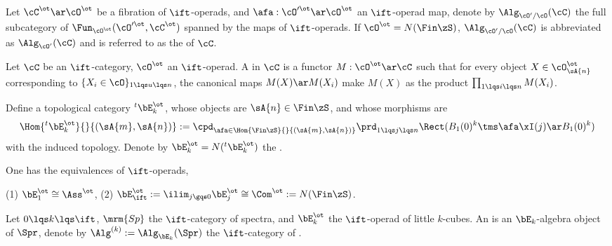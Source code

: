 \documentclass[article, a4paper, twoside]{universal}
\begin{document}
\begin{dfn}[2.1.3.1]
    Let $\cC^{\ot}\ar\cO^{\ot}$ be a fibration of $\ift$-operads, and $\afa:\cO'^{\ot}\ar\cO^{\ot}$ an $\ift$-operad map, denote by $\Alg_{\cO'/\cO}(\cC)$ the full subcategory of $\Fun_{\cO^{\ot}}(\cO'^{\ot},\cC^{\ot})$ spanned by the maps of $\ift$-operads. If $\cO^{\ot}=N(\Fin\zS)$, $\Alg_{\cO'/\cO}(\cC)$ is abbreviated as $\Alg_{\cO'}(\cC)$ and is referred to as the  of $\cC$.
\end{dfn}


\begin{dfn}[2.4.2.1]
    Let $\cC$ be an $\ift$-category, $\cO^{\ot}$ an $\ift$-operad. A  in $\cC$ is a functor $M:\cO^{\ot}\ar\cC$ such that for every object $X\in\cO_{\sA{n}}^{\ot}$ corresponding to $\{X_{i}\in\cO\}_{1\lqs u\lqs n}$, the canonical maps $M(X)\ar M(X_{i})$ make $M(X)$ as the product $\prod_{1\lqs i\lqs n} M(X_{i})$.
\end{dfn}


\begin{dfn}[5.1.0.2, 5.1.0.4]
    Define a topological category ${}^{t}\bE_{k}^{\ot}$, whose objects are $\sA{n}\in\Fin\zS$, and whose morphisms are
    \[
        \Hom{{}^{t}\bE_{k}^{\ot}}{}{(\sA{m},\sA{n})}:=\cpd_{\afa\in\Hom{\Fin\zS}{}{(\sA{m},\sA{n})}}\prd_{1\lqs j\lqs n}\Rect(B_{1}(0)^{k}\tms\afa\xI(j)\ar B_{1}(0)^{k})
    \]
    with the induced topology. Denote by $\bE_{k}^{\ot}=N({}^{t}\bE_{k}^{\ot})$ the .
\end{dfn}

\begin{thm}[5.1.0.7, 5.1.1.5]
    One has the equivalences of $\ift$-operads,

    (1) $\bE_{1}^{\ot}\cong\Ass^{\ot}$, (2) $\bE_{\ift}^{\ot}:=\ilim_{j\gqs0}\bE_{j}^{\ot}\cong \Com^{\ot}:=N(\Fin\zS)$.
\end{thm}


\begin{dfn}[7.1.0.1]
    Let $0\lqs k\lqs \ift$, $\mrm{Sp}$ the $\ift$-category of spectra, and $\bE_{k}^{\ot}$ the $\ift$-operad of little $k$-cubes. An  is an $\bE_{k}$-algebra object of $\Spr$, denote by $\Alg^{(k)}:=\Alg_{\bE_{k}}(\Spr)$ the $\ift$-category of .
\end{dfn}



\printref
\end{document}
